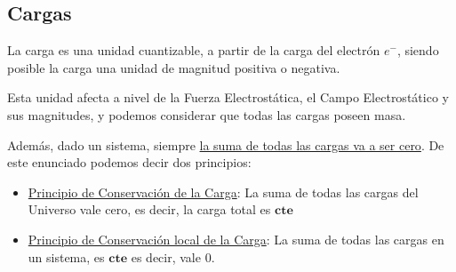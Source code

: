 \subsection{Cargas}
\noindent La carga es una unidad cuantizable, a partir de la carga del electrón \(e^{-}\),  siendo posible la carga una unidad de magnitud positiva o negativa. \par \noindent
Esta unidad afecta a nivel de la Fuerza Electrostática, el Campo Electrostático y sus magnitudes, y podemos considerar que todas las cargas poseen masa. \par \noindent
Además, dado un sistema, siempre \underline{la suma de todas las cargas va a ser cero}. De este enunciado podemos decir dos principios:


\begin{itemize}
        \item \underline{Principio de Conservación de la Carga}: La suma de todas las cargas del Universo vale cero, es decir, la carga total es \(\bm{cte}\)
        \item \underline{Principio de Conservación local de la Carga}: La suma de todas las cargas en un sistema, es \(\bm{cte}\) es decir, vale 0.
\end{itemize}

